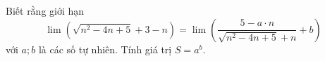 \begin{ex}
Biết rằng giới hạn \[\lim\left(\sqrt{n^2-4n+5}+3-n\right)=\lim\left(\dfrac{5-a\cdot n}{\sqrt{n^2-4n+5}+n}+b\right)\] với $a;b$ là các số tự nhiên. Tính giá trị $S=a^b$.
\end{ex}
